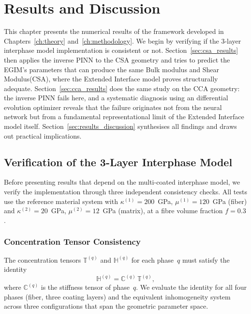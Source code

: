\documentclass[oneside, 12pt, a4paper, bibliography=totoc]{book}
\newcommand{\tens}[1]{\mathbb{#1}}                 %
\begin{document}
\chapter{Results and Discussion}
\label{ch:results}

This chapter presents the numerical results of the framework developed in Chapters~\ref{ch:theory} and~\ref{ch:methodology}. We begin by verifying if the 3-layer interphase model implementation is consistent or not. Section~\ref{sec:csa_results} then applies the inverse PINN to the CSA geometry and tries to predict the EGIM's parameters that can produce the same Bulk modulus and Shear Modulus(CSA), where the  Extended Interface model proves structurally adequate.  Section~\ref{sec:cca_results} does the same study on the CCA geometry: the inverse PINN fails here, and a systematic diagnosis using an differential evolution optimizer reveals that the failure originates not from the neural network but from a fundamental representational limit of the Extended Interface model itself. Section~\ref{sec:results_discussion} synthesises all findings and draws out practical implications.

\section{Verification of the 3-Layer Interphase Model}
\label{sec:verification}

Before presenting results that depend on the multi-coated interphase model, we verify the implementation through three independent consistency checks. All tests use the reference material system with $\kappa^{(1)} = 200$~GPa, $\mu^{(1)} = 120$~GPa (fiber) and $\kappa^{(2)} = 20$~GPa, $\mu^{(2)} = 12$~GPa (matrix), at a fibre volume fraction $f = 0.3$.

\subsection{Concentration Tensor Consistency}
\label{subsec:hct_check}

The concentration tensors $\tens{T}^{(q)}$ and $\tens{H}^{(q)}$ for each phase~$q$ must satisfy the identity
%
\begin{equation}
    \tens{H}^{(q)} = \tens{C}^{(q)} \, \tens{T}^{(q)},
    \label{eq:hct_identity}
\end{equation}
%
where $\tens{C}^{(q)}$ is the stiffness tensor of phase~$q$. We evaluate the identity for all four phases (fiber, three coating layers) and the equivalent inhomogeneity system across three configurations that span the geometric parameter space.
\end{document}
